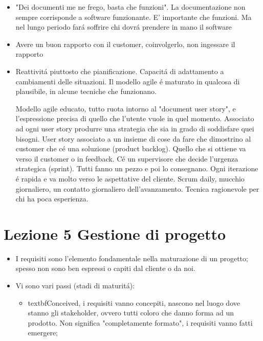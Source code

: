\documentclass[a4paper,10pt] {article}
\begin{document}
\begin{itemize}
\begin{itemize}
\begin{itemize}
\begin{itemize}
	\item "Dei documenti me ne frego, basta che funzioni". La documentazione 
	non sempre corrisponde a software funzionante. E' importante che funzioni. 
	Ma nel lungo periodo far\'a soffrire chi dovr\'a prendere in mano il 
	software
	
	\item Avere un buon rapporto con il customer, coinvolgerlo, non ingessare 
	il rapporto
	
	\item Reattivit\'a piuttosto che pianificazione. Capacit\'a di adattamento 
	a cambiamenti delle situazioni.
	Il modello agile \'e maturato in qualcosa di plausibile, in alcune tecniche 
	che funzionano.
	
	
	Modello agile educato, tutto ruota intorno al "document user story", e 
	l'espressione precisa di quello
	che l'utente vuole in quel momento. Associato ad ogni user story produrre 
	una strategia che sia in grado di soddisfare quei bisogni. User story 
	associato a un insieme di cose da fare che dimostrino al customer
	che c\'e una soluzione (product backlog). Quello che si ottiene va verso il 
	customer o in feedback. C\'e un supervisore che decide l'urgenza strategica 
	(sprint). Tutti fanno un pezzo e poi lo consegnano. Ogni iterazione \'e 
	rapida e va molto verso le aspettative del cliente.
	Scrum daily, mucchio giornaliero, un contatto giornaliero dell'avanzamento. 
	Tecnica ragionevole per chi ha poca esperienza.
	\end{itemize}
\end{itemize}	

\end{itemize}
\section{Lezione 5 Gestione di progetto}
\begin{itemize}
	\item I requisiti sono l'elemento fondamentale nella maturazione di un 
	progetto; spesso non sono ben espressi o capiti dal cliente o da noi. 
	
	\item Vi sono vari passi (stadi di maturit\'a):
	\begin{itemize}
		
	\item textbf{Conceived}, i requisiti vanno concepiti, nascono nel luogo 
	dove stanno gli stakeholder, ovvero tutti coloro che danno forma ad un 
	prodotto. Non significa "completamente formato", i requisiti vanno fatti
	emergere;
	

\end{itemize}
\end{itemize}
\end{itemize}
\end{document}
